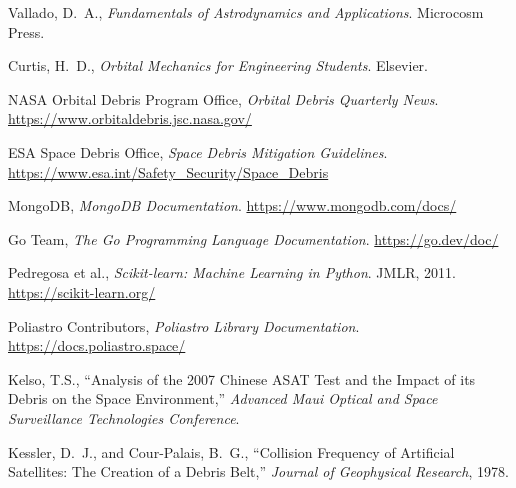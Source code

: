 \documentclass[11pt, a4paper]{article}
\begin{document}
\begin{enumerate}[leftmargin=1.5cm, label={[\arabic*]}]
  \item Vallado, D.~A., \textit{Fundamentals of Astrodynamics and Applications}. Microcosm Press.
  \item Curtis, H.~D., \textit{Orbital Mechanics for Engineering Students}. Elsevier.
  \item NASA Orbital Debris Program Office, \textit{Orbital Debris Quarterly News}.\\ \url{https://www.orbitaldebris.jsc.nasa.gov/}
  \item ESA Space Debris Office, \textit{Space Debris Mitigation Guidelines}.\\ \url{https://www.esa.int/Safety_Security/Space_Debris}
  \item MongoDB, \textit{MongoDB Documentation}. \url{https://www.mongodb.com/docs/}
  \item Go Team, \textit{The Go Programming Language Documentation}. \url{https://go.dev/doc/}
  \item Pedregosa et al., \textit{Scikit-learn: Machine Learning in Python}. JMLR, 2011.\\ \url{https://scikit-learn.org/}
  \item Poliastro Contributors, \textit{Poliastro Library Documentation}.\\ \url{https://docs.poliastro.space/}
  \item Kelso, T.S., ``Analysis of the 2007 Chinese ASAT Test and the Impact of its Debris on the Space Environment,'' \textit{Advanced Maui Optical and Space Surveillance Technologies Conference}.
  \item Kessler, D.~J., and Cour-Palais, B.~G., ``Collision Frequency of Artificial Satellites: The Creation of a Debris Belt,'' \textit{Journal of Geophysical Research}, 1978.
\end{enumerate}
\end{document}
